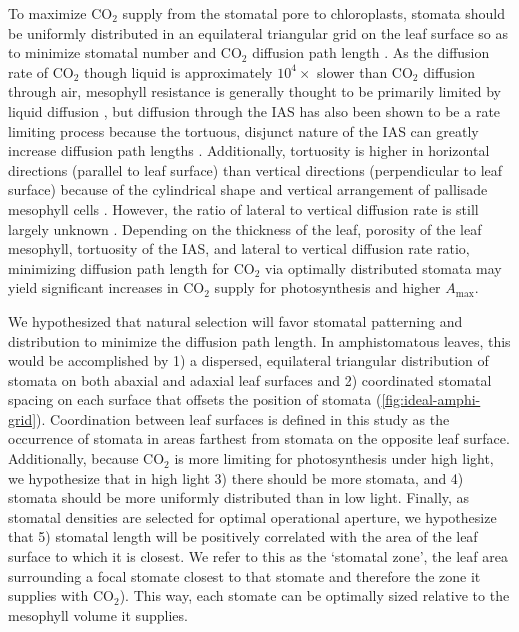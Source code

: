 \documentclass[webpdf,large,modern,unnumsec,namedate]{oup-authoring-template}
\begin{document}
To maximize CO\(_2\) supply from the stomatal pore to chloroplasts,
stomata should be uniformly distributed in an equilateral triangular
grid on the leaf surface so as to minimize stomatal number and CO\(_2\)
diffusion path length \citep{parkhurst_diffusion_1994}. As the diffusion
rate of CO\(_2\) though liquid is approximately \(10^4\times\) slower
than CO\(_2\) diffusion through air, mesophyll resistance is generally
thought to be primarily limited by liquid diffusion
\citep{aalto_three-dimensional_2002, evans_resistances_2009}, but
diffusion through the IAS has also been shown to be a rate limiting
process because the tortuous, disjunct nature of the IAS can greatly
increase diffusion path lengths \citep{harwood_understanding_2021}.
Additionally, tortuosity is higher in horizontal directions (parallel to
leaf surface) than vertical directions (perpendicular to leaf surface)
because of the cylindrical shape and vertical arrangement of pallisade
mesophyll cells \citep{earles_beyond_2018, harwood_understanding_2021}.
However, the ratio of lateral to vertical diffusion rate is still
largely unknown
\citep{morison_lateral_2005, pieruschka_lateral_2005, pieruschka_lateral_2006}.
Depending on the thickness of the leaf, porosity of the leaf mesophyll,
tortuosity of the IAS, and lateral to vertical diffusion rate ratio,
minimizing diffusion path length for CO\(_2\) via optimally distributed
stomata may yield significant increases in CO\(_2\) supply for
photosynthesis and higher \(A_\text{max}\).

We hypothesized that natural selection will favor stomatal patterning
and distribution to minimize the diffusion path length. In
amphistomatous leaves, this would be accomplished by 1) a dispersed,
equilateral triangular distribution of stomata on both abaxial and
adaxial leaf surfaces and 2) coordinated stomatal spacing on each
surface that offsets the position of stomata
(\autoref{fig:ideal-amphi-grid}). Coordination between leaf surfaces is
defined in this study as the occurrence of stomata in areas farthest
from stomata on the opposite leaf surface. Additionally, because
CO\(_2\) is more limiting for photosynthesis under high light, we
hypothesize that in high light 3) there should be more stomata, and 4)
stomata should be more uniformly distributed than in low light. Finally,
as stomatal densities are selected for optimal operational aperture, we
hypothesize that 5) stomatal length will be positively correlated with
the area of the leaf surface to which it is closest. We refer to this as
the `stomatal zone', the leaf area surrounding a focal stomate closest
to that stomate and therefore the zone it supplies with CO\(_2\)). This
way, each stomate can be optimally sized relative to the mesophyll
volume it supplies.
\end{document}
